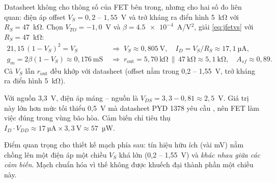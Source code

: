 Datasheet không cho thông số của FET bên trong, nhưng cho hai số đo liên quan: điện áp offset $V_S = 0{,}2 \text{ -- } 1{,}55$~V và trở kháng ra điển hình 5~kΩ với $R_S = 47$~kΩ. Chọn $V_{TO} = -1{,}0$~V và $\beta = \num{4.5e-4}$~A/V$^2$, giải \eqref{eq:jfetvs} với $R_S = 47$~kΩ:
\begin{align*}
  21{,}15\,(1 - V_S)^2 = V_S \;&\Rightarrow\; V_S \approx 0{,}805~\text{V},\quad I_D = V_S/R_S \approx 17{,}1~\text{µA},\\
  g_m = 2\beta(1-V_S) \approx 0{,}176~\text{mS} \;&\Rightarrow\; r_\text{out} = 5{,}70~\text{kΩ}\,\|\,47~\text{kΩ} \approx 5{,}1~\text{kΩ},\quad A_{sf} \approx 0{,}89 .
\end{align*}
Cả $V_S$ lẫn $r_\text{out}$ đều khớp với datasheet (offset nằm trong 0,2 -- 1,55~V, trở kháng ra điển hình 5~kΩ).

Với nguồn 3,3~V, điện áp máng -- nguồn là $V_{DS} = 3{,}3 - 0{,}81 \approx 2{,}5$~V. Giá trị này lớn hơn mức tối thiểu 0,5~V mà datasheet PYD 1378 yêu cầu \cite{pyd1378}, nên FET làm việc đúng trong vùng bão hòa. Cảm biến chỉ tiêu thụ $I_D \cdot V_{DD} \approx 17~\text{µA}\times 3{,}3~\text{V} \approx 57$~µW.

Điểm quan trọng cho thiết kế mạch phía sau: tín hiệu hữu ích (vài mV) nằm chồng lên một điện áp một chiều $V_S$ khá lớn (0,2 -- 1,55~V) và \emph{khác nhau giữa các cảm biến}. Mạch chuẩn hóa vì thế không được khuếch đại thành phần một chiều này.
